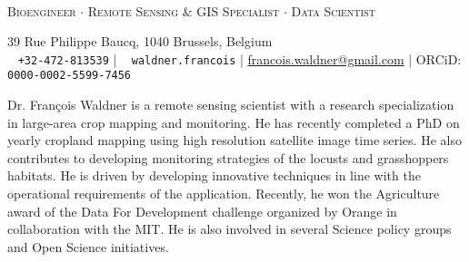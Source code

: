 \documentclass[11pt, a4paper]{article} %
\newcommand*\fanMobile{{\FA\symbol{"F10B}}}
\begin{document}

\begin{adjustwidth}{-2.4cm}{2.4cm}
\begin{minipage}[b]{1.17\textwidth}
\centering
\vspace{-0.5cm}
\hspace{-0.4cm} \\
\vspace{0.2cm}
{\large \color{awesome} \textsc{Bioengineer $\cdot$ Remote Sensing \& GIS Specialist $\cdot$ Data Scientist}}\\
\end{minipage}%
\end{adjustwidth}

\vspace{0.2cm}

\begin{adjustwidth}{-2.4cm}{2.4cm}
\begin{minipage}[b]{1.17\textwidth}
\centering
\small

39 Rue Philippe Baucq, 1040 Brussels, Belgium\\
\fanMobile ~  \texttt{+32-472-813539} | 
\faSkype ~ \texttt{waldner.francois} | 
 \href{mailto:francois.waldner@gmail.com}{francois.waldner@gmail.com} | 
ORCiD: \texttt{0000-0002-5599-7456}
\end{minipage}%
\end{adjustwidth}

\vspace{0.2cm}

\begin{adjustwidth}{-2.4cm}{2.4cm}
\begin{minipage}[b]{1.17\textwidth}

\small
\color{graytext}
Dr. Fran\c{c}ois Waldner is a remote sensing scientist with a research specialization in large-area crop mapping and monitoring. He has recently completed a PhD on yearly cropland mapping using high resolution satellite image time series. He also contributes to developing monitoring strategies of the locusts and grasshoppers habitats. He is driven by developing innovative techniques in line with the operational requirements of the application.  Recently, he won the Agriculture award of the Data For Development  challenge organized by Orange in collaboration with the MIT. He is also  involved in several Science policy groups and Open Science initiatives.
\end{minipage}%
\end{adjustwidth}
\end{document}
